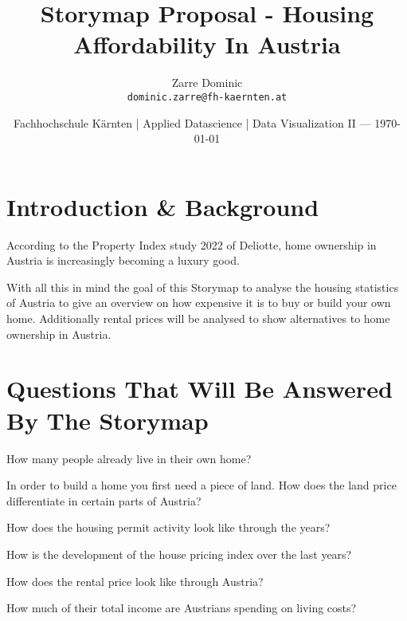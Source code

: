 \documentclass{article}
\title{Storymap Proposal - Housing Affordability In Austria} %
\author{Zarre Dominic\\ \texttt{dominic.zarre@fh-kaernten.at}} %
\date{\small Fachhochschule Kärnten | Applied Datascience | Data Visualization II --- \today} %
\begin{document}
\maketitle %



\section*{Introduction \& Background} %

\noindent According to the Property Index study 2022 of Deliotte, home ownership in Austria is increasingly becoming a luxury good. \cite{Standard}

 \cite{Deliotte}

\noindent With all this in mind the goal of this Storymap to analyse the housing statistics of Austria to give an overview on how expensive it is to buy or build your own home. 
Additionally rental prices will be analysed to show alternatives to home ownership in Austria. 



\section*{Questions That Will Be Answered By The Storymap} %


\begin{question}
	How many people already live in their own home?
\end{question}
\begin{question}
	In order to build a home you first need a piece of land. How does the land price differentiate in certain parts of Austria?
\end{question}
\begin{question}
	How does the housing permit activity look like through the years?
\end{question}
\begin{question}
	How is the development of the house pricing index over the last years?
\end{question}
\begin{question}
	How does the rental price look like through Austria?
\end{question}
\begin{question}
	How much of their total income are Austrians spending on living costs?
\end{question}
	
\end{document}
